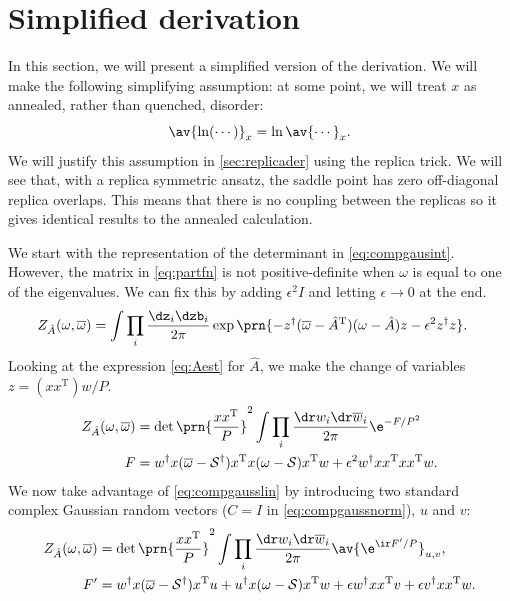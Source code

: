 \documentclass[12pt]{article}
\newcommand{\inv}{^{-1}}
\newcommand{\dg}{^\dagger}
\newcommand{\trans}{^\mathrm{T}}
\newcommand{\shift}{\mathcal{S}}
\newcommand{\aest}{\hat{A}}
\newcommand{\omb}{\overline{\omega}}
\newcommand{\dw}{\dr w}
\newcommand{\dwb}{\dr\overline{w}}
\begin{document}
\section{Simplified derivation}\label{sec:simplederiv}

In this section, we will present a simplified version of the derivation.
We will make the following simplifying assumption: at some point, we will treat $x$ as annealed, rather than quenched, disorder:
%
\begin{equation}\label{eq:annealed}
  \av{\ln (\cdots)}_x = \ln\av{\cdots}_x.
\end{equation}
%
We will justify this assumption in \autoref{sec:replicader} using the replica trick.
We will see that, with a replica symmetric ansatz, the saddle point has zero off-diagonal replica overlaps.
This means that there is no coupling between the replicas so it gives identical results to the annealed calculation.

We start with the representation of the determinant in \eqref{eq:compgausint}.
However, the matrix in \eqref{eq:partfn} is not positive-definite when $\omega$ is equal to one of the eigenvalues.
We can fix this by adding $\epsilon^2I$ and letting $\epsilon\to0$ at the end.
%
\begin{equation}\label{eq:partfnintz}
\begin{aligned}
  Z_{\aest} (\omega,\omb) &= \int \prod_i\frac{\dz_i\dzb_i}{2\pi} \exp\prn{
    -z\dg (\omb-\aest \trans)(\omega-\aest ) z - \epsilon^2 z\dg z} .%
\end{aligned}
\end{equation}
%
Looking at the expression \eqref{eq:Aest} for $\aest $, we make the change of variables $z=(xx\trans)w/P$.
%
\begin{equation}\label{eq:partfnintw}
\begin{aligned}
  Z_{\aest} (\omega,\omb) &= \det\prn{\frac{xx\trans}{P}}^2 \int \prod_i\frac{\dw_i\dwb_i}{2\pi}\e^{-F/P^2}
    \\
  F &=
     w\dg x(\omb-\shift\dg)x\trans x(\omega-\shift)x\trans w + \epsilon^2 w\dg xx\trans xx\trans w .%
\end{aligned}
\end{equation}
%
We now take advantage of \eqref{eq:compgausslin} by introducing two standard complex Gaussian random vectors ($C=I$ in \eqref{eq:compgaussnorm}), $u$ and $v$:
%
\begin{equation}\label{eq:partfnintwuv}
\begin{aligned}
  Z_{\aest} (\omega,\omb) &= \det\prn{\frac{xx\trans}{P}}^2 \int \prod_i\frac{\dw_i\dwb_i}{2\pi} \av{\e^{\ir F'/P}}_{u,v},\\
  F' &=
    w\dg x(\omb-\shift\dg)x\trans u + u\dg x(\omega-\shift)x\trans w + \epsilon w\dg xx\trans v + \epsilon v\dg xx\trans w .%
\end{aligned}
\end{equation}
%
\end{document}
